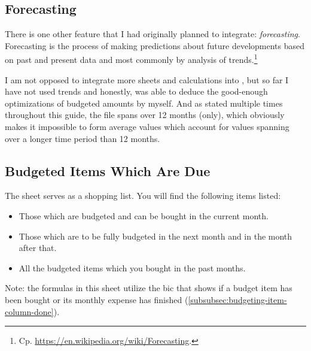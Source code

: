 \subsection{Forecasting}
\label{subsec:forecasting}

There is one other feature that I had originally planned to integrate: \emph{forecasting}.
Forecasting is the process of making predictions about future developments based on past and present data and most commonly by analysis of trends.\footnote{Cp. \href{https://en.wikipedia.org/wiki/Forecasting}{https://en.wikipedia.org/wiki/Forecasting}.}

I am not opposed to integrate more sheets and calculations into \tfn, but so far I have not used trends and honestly, was able to deduce the good-enough optimizations of budgeted amounts by myself.
And as stated multiple times throughout this guide, the file spans over 12 months (only), which obviously makes it impossible to form average values which account for values spanning over a longer time period than 12 months.

\subsection{Budgeted Items Which Are Due}
\label{subsec:budgeted-items-which-are-due}

The sheet  serves as a shopping list.
You will find the following items listed:
\begin{itemize}
	\item Those which are budgeted and can be bought in the current month.
	\item Those which are to be fully budgeted in the next month and in the month after that.
	\item All the budgeted items which you bought in the past months.
\end{itemize}

Note: the formulas in this sheet utilize the \ac{bic} that shows if a budget item has been bought or its monthly expense has finished (\autoref{subsubsec:budgeting-item-column-done}).